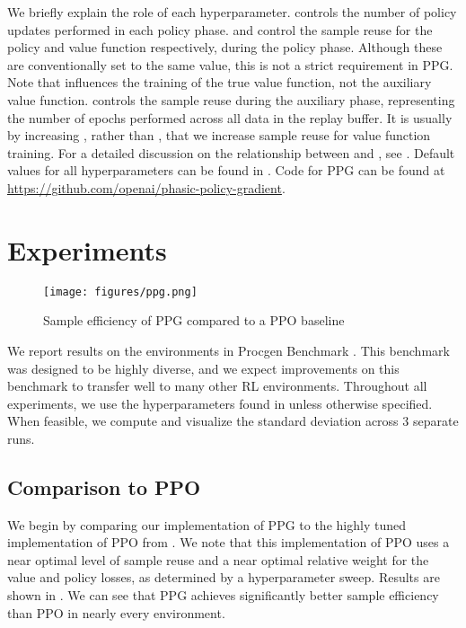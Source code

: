 \documentclass{article}
\begin{document}
We briefly explain the role of each hyperparameter.  controls the number of policy updates performed in each policy phase.  and  control the sample reuse for the policy and value function respectively, during the policy phase. Although these are conventionally set to the same value, this is not a strict requirement in PPG. Note that  influences the training of the true value function, not the auxiliary value function.  controls the sample reuse during the auxiliary phase, representing the number of epochs performed across all data in the replay buffer. It is usually by increasing , rather than , that we increase sample reuse for value function training. For a detailed discussion on the relationship between  and , see . Default values for all hyperparameters can be found in . Code for PPG can be found at \href{https://github.com/openai/phasic-policy-gradient}{https://github.com/openai/phasic-policy-gradient}.

\section{Experiments}

\begin{figure*}
\centering
\texttt{[image: figures/ppg.png]}
\caption{Sample efficiency of PPG compared to a PPO baseline}
\label{fig:ppg_vs_ppo}
\end{figure*}

We report results on the environments in Procgen Benchmark \citep{procgen}. This benchmark was designed to be highly diverse, and we expect improvements on this benchmark to transfer well to many other RL environments. Throughout all experiments, we use the hyperparameters found in  unless otherwise specified. When feasible, we compute and visualize the standard deviation across 3 separate runs.

\subsection{Comparison to PPO}

We begin by comparing our implementation of PPG to the highly tuned implementation of PPO from \cite{procgen}. We note that this implementation of PPO uses a near optimal level of sample reuse and a near optimal relative weight for the value and policy losses, as determined by a hyperparameter sweep. Results are shown in . We can see that PPG achieves significantly better sample efficiency than PPO in nearly every environment.
\end{document}
